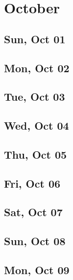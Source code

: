 \chapter{October}
	\section{Sun, Oct 01}
		
		
	\section{Mon, Oct 02}
		
		
	\section{Tue, Oct 03}
		
		
	\section{Wed, Oct 04}
		
		
	\section{Thu, Oct 05}
		
		
	\section{Fri, Oct 06}
		
		
	\section{Sat, Oct 07}
		
		
	\section{Sun, Oct 08}
		
		
	\section{Mon, Oct 09}
		
		
